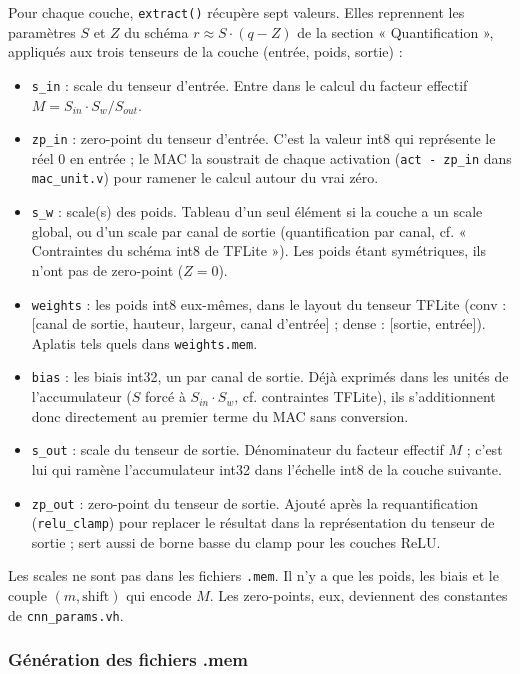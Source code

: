 \documentclass[11pt,a4paper]{article}
\begin{document}
Pour chaque couche, \texttt{extract()} récupère sept valeurs. Elles
reprennent les paramètres $S$ et $Z$ du schéma $r \approx S \cdot (q - Z)$ de
la section « Quantification », appliqués aux trois tenseurs de la couche
(entrée, poids, sortie) :
\begin{itemize}
  \item \texttt{s\_in} : scale du tenseur d'entrée. Entre dans le calcul du
    facteur effectif $M = S_{in} \cdot S_w / S_{out}$.
  \item \texttt{zp\_in} : zero-point du tenseur d'entrée. C'est la valeur
    int8 qui représente le réel 0 en entrée ; le MAC la soustrait de chaque
    activation (\texttt{act - zp\_in} dans \texttt{mac\_unit.v}) pour
    ramener le calcul autour du vrai zéro.
  \item \texttt{s\_w} : scale(s) des poids. Tableau d'un seul élément si la
    couche a un scale global, ou d'un scale par canal de sortie
    (quantification par canal, cf. « Contraintes du schéma int8 de
    TFLite »). Les poids étant symétriques, ils n'ont pas de zero-point
    ($Z = 0$).
  \item \texttt{weights} : les poids int8 eux-mêmes, dans le layout du
    tenseur TFLite (conv : [canal de sortie, hauteur, largeur, canal
    d'entrée] ; dense : [sortie, entrée]). Aplatis tels quels dans
    \texttt{weights.mem}.
  \item \texttt{bias} : les biais int32, un par canal de sortie. Déjà
    exprimés dans les unités de l'accumulateur ($S$ forcé à
    $S_{in} \cdot S_w$, cf. contraintes TFLite), ils s'additionnent donc
    directement au premier terme du MAC sans conversion.
  \item \texttt{s\_out} : scale du tenseur de sortie. Dénominateur du facteur
    effectif $M$ ; c'est lui qui ramène l'accumulateur int32 dans l'échelle
    int8 de la couche suivante.
  \item \texttt{zp\_out} : zero-point du tenseur de sortie. Ajouté après la
    requantification (\texttt{relu\_clamp}) pour replacer le résultat dans la
    représentation du tenseur de sortie ; sert aussi de borne basse du clamp
    pour les couches ReLU.
\end{itemize}

Les scales ne sont pas dans les fichiers \texttt{.mem}. Il n'y a que les
poids, les biais et le couple $(m, \text{shift})$ qui encode $M$. Les
zero-points, eux, deviennent des constantes de \texttt{cnn\_params.vh}.

\subsubsection{Génération des fichiers .mem}
\end{document}
